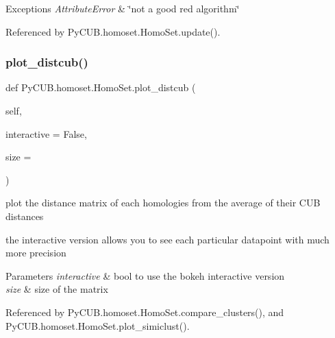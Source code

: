 \begin{DoxyExceptions}{Exceptions}
{\em Attribute\+Error} & \char`\"{}not a good red algorithm\char`\"{} \\
\hline
\end{DoxyExceptions}


Referenced by Py\+C\+U\+B.\+homoset.\+Homo\+Set.\+update().

\mbox{\label{class_py_c_u_b_1_1homoset_1_1_homo_set_aa385d8acea32381efae12c219c24a331}} 
\subsubsection{\texorpdfstring{plot\+\_\+distcub()}{plot\_distcub()}}
{\footnotesize\ttfamily def Py\+C\+U\+B.\+homoset.\+Homo\+Set.\+plot\+\_\+distcub (\begin{DoxyParamCaption}\item[{}]{self,  }\item[{}]{interactive = {\ttfamily False},  }\item[{}]{size = {} }\end{DoxyParamCaption})}



plot the distance matrix of each homologies from the average of their C\+UB distances 

the interactive version allows you to see each particular datapoint with much more precision


\begin{DoxyParams}{Parameters}
{\em interactive} & bool to use the bokeh interactive version \\
\hline
{\em size} & size of the matrix \\
\hline
\end{DoxyParams}


Referenced by Py\+C\+U\+B.\+homoset.\+Homo\+Set.\+compare\+\_\+clusters(), and Py\+C\+U\+B.\+homoset.\+Homo\+Set.\+plot\+\_\+simiclust().

\mbox{\label{class_py_c_u_b_1_1homoset_1_1_homo_set_a8ab62bae7be17abf4b13ad37d5c881eb}} 
